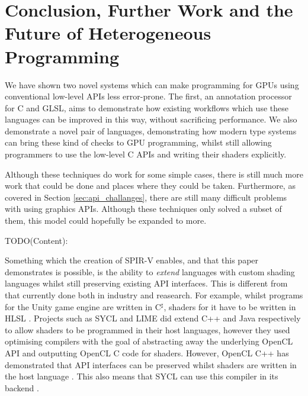 \documentclass[a4paper,12pt,twoside,openright]{report}
\begin{document}


\chapter{Conclusion, Further Work and the Future of Heterogeneous Programming}



We have shown two novel systems which can make programming for GPUs using
conventional low-level APIs less error-prone. The first, an annotation
processor for C and GLSL, aims to demonstrate how existing workflows which use
these languages can be improved in this way, without sacrificing performance.
We also demonstrate a novel pair of languages, demonstrating how modern type
systems can bring these kind of checks to GPU programming, whilst still
allowing programmers to use the low-level C APIs and writing their shaders
explicitly.

Although these techniques do work for some simple cases, there is still much
more work that could be done and places where they could be taken. Furthermore,
as covered in Section \ref{sec:api_challanges}, there are still many difficult
problems with using graphics APIs. Although these techniques only solved a
subset of them, this model could hopefully be expanded to more.

TODO(Content):


Something which the creation of SPIR-V enables, and that this paper
demonstrates is possible, is the ability to \textit{extend} languages with
custom shading languages whilst still preserving existing API interfaces. This
is different from that currently done both in industry and reasearch. For
example, whilst programs for the Unity game engine are written in C$^\sharp$,
shaders for it have to be written in HLSL \cite{TODO}. Projects such as SYCL
and LIME did extend C++ and Java respectively to allow shaders to be programmed
in their host languages, however they used optimising compilers with the goal
of abstracting away the underlying OpenCL API and outputting OpenCL C code for
shaders. However, OpenCL C++ has demonstrated that API interfaces can be
preserved whilst shaders are written in the host language
\cite{OpenCLCPPWhitePaper}. This also means that SYCL can use this compiler in
its backend \cite{TODO}.
\end{document}
